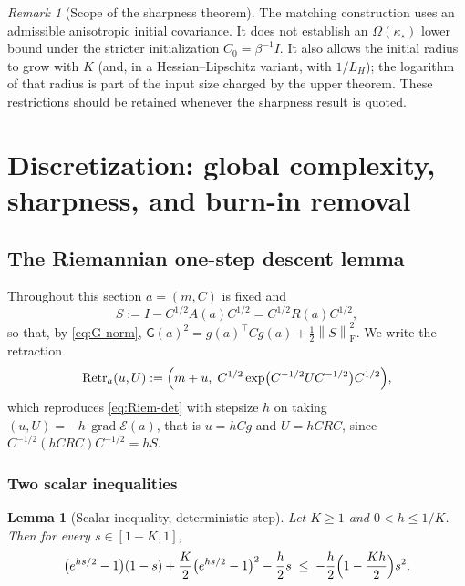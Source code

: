 \documentclass[11pt]{article}
\theoremstyle{plain}
\newtheorem{lemma}[lemma]{Lemma}
\theoremstyle{definition}
\theoremstyle{remark}
\newtheorem{remark}[remark]{Remark}
\newcommand{\Id}{I}
\newcommand{\grad}{\operatorname{grad}}
\newcommand{\Frob}{\mathrm{F}}
\newcommand{\calE}{\mathcal{E}}
\newcommand{\norm}[1]{\left\lVert #1\right\rVert}
\newcommand{\Gradnorm}{\mathsf{G}}
\newcommand{\Retr}{\operatorname{Retr}}
\newcommand{\kappastar}{\kappa_\star}
\begin{document}
\begin{remark}[Scope of the sharpness theorem]
The matching construction uses an admissible anisotropic initial covariance. It does not establish an
$\Omega(\kappastar)$ lower bound under the stricter initialization $C_0=\beta^{-1}\Id$. It also allows
the initial radius to grow with $K$ (and, in a Hessian--Lipschitz variant, with $1/L_H$); the logarithm
of that radius is part of the input size charged by the upper theorem. These restrictions should be
retained whenever the sharpness result is quoted.
\end{remark}

\section{Discretization: global complexity, sharpness, and burn-in removal}
\label{sec:disc}

\subsection{The Riemannian one-step descent lemma}
\label{sec:descent}

Throughout this section $a=(m,C)$ is fixed and
\begin{equation}
\label{eq:S-def}
    S:=\Id-C^{1/2}A(a)C^{1/2}=C^{1/2}R(a)C^{1/2},
\end{equation}
so that, by \eqref{eq:G-norm}, $\Gradnorm(a)^2=g(a)^\top Cg(a)+\tfrac12\norm{S}_{\Frob}^2$. We write
the retraction
\begin{equation}
\label{eq:retraction}
    \Retr_a(u,U):=\Bigl(m+u,\;C^{1/2}\exp\bigl(C^{-1/2}UC^{-1/2}\bigr)C^{1/2}\Bigr),
\end{equation}
which reproduces \eqref{eq:Riem-det} with stepsize $h$ on taking
$(u,U)=-h\,\grad\calE(a)$, that is $u=hCg$ and $U=hCRC$,
since $C^{-1/2}(hCRC)C^{-1/2}=hS$.

\subsubsection{Two scalar inequalities}

\begin{lemma}[Scalar inequality, deterministic step]
\label{lem:scalar-det}
Let $K\geq1$ and $0<h\leq1/K$. Then for every $s\in[1-K,1]$,
\begin{equation}
\label{eq:scalar-det}
    \bigl(e^{hs/2}-1\bigr)(1-s)+\frac K2\bigl(e^{hs/2}-1\bigr)^2-\frac h2s
    \;\leq\;
    -\frac h2\Bigl(1-\frac{Kh}2\Bigr)s^2 .
\end{equation}
\end{lemma}
\end{document}
